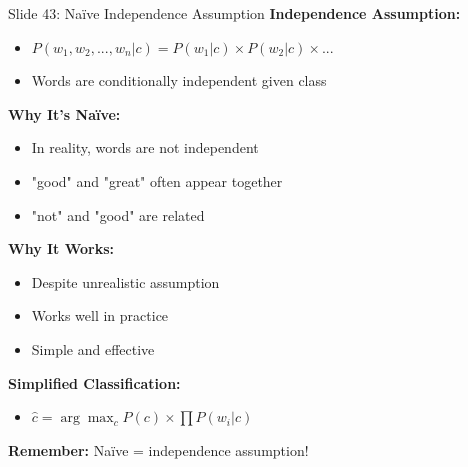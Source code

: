 \documentclass[8pt]{beamer}
\begin{document}
	\begin{frame}{Slide 43: Naïve Independence Assumption}
		\fontsize{6.5}{7.5}\selectfont
		\textbf{Independence Assumption:}
		\begin{itemize}
			\item $P(w_1, w_2, ..., w_n | c) = P(w_1|c) \times P(w_2|c) \times ...$
			\item Words are conditionally independent given class
		\end{itemize}
		
		\vspace{0.1cm}
		\textbf{Why It's Naïve:}
		\begin{itemize}
			\item In reality, words are not independent
			\item "good" and "great" often appear together
			\item "not" and "good" are related
		\end{itemize}
		
		\vspace{0.1cm}
		\textbf{Why It Works:}
		\begin{itemize}
			\item Despite unrealistic assumption
			\item Works well in practice
			\item Simple and effective
		\end{itemize}
		
		\vspace{0.1cm}
		\textbf{Simplified Classification:}
		\begin{itemize}
			\item $\hat{c} = \arg\max_{c} P(c) \times \prod P(w_i|c)$
		\end{itemize}
		
		\textcolor{myblue}{\textbf{Remember:}} Naïve = independence assumption!
	\end{frame}
	
\end{document}
